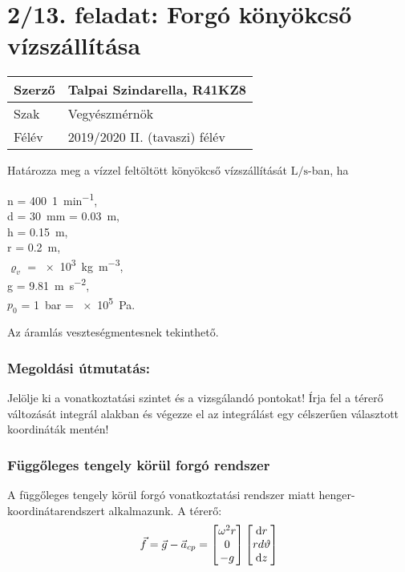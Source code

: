\section*{2/13. feladat: Forgó könyökcső vízszállítása}
\begin{tabular}{ | p{2cm} | p{14cm} | } 
	\hline
	Szerző & Talpai Szindarella, R41KZ8 \\ 
	\hline
	Szak & Vegyészmérnök \\ 
	\hline
	Félév & 2019/2020 II. (tavaszi) félév \\ 
	\hline
\end{tabular}
\vspace{0.5cm}

\noindent Határozza meg a vízzel feltöltött könyökcső vízszállítását $\si{\liter\per\second}$-ban, ha
\begin{flushleft}
	n = \SI{400}{1\per\minute},\\
	d = \SI{30}{\milli\meter} = \SI{0,03}{\meter},\\
	h = \SI{0,15}{\meter},\\
	r = \SI{0,2}{\meter},\\
	$\varrho_{v}$ = \SI{e3}{\kilogram\per\meter\cubed},\\
	g = \SI{9,81}{\meter\per\second\squared},\\
	$p_{0}$ = \SI{1}{\bar} = \SI{e5}{\pascal}.
\end{flushleft}
\vspace{2mm}

\noindent Az áramlás veszteségmentesnek tekinthető.

\subsubsection*{ Megoldási útmutatás:}

\vspace{2mm}

\begin{flushleft}
	Jelölje ki a vonatkoztatási szintet és a vizsgálandó pontokat!
	Írja fel a térerő változását integrál alakban és végezze el az integrálást egy célszerűen választott koordináták mentén!
\end{flushleft}

\noindent\hrulefill

\subsubsection{Függőleges tengely körül forgó rendszer}
A függőleges tengely körül forgó vonatkoztatási rendszer miatt henger-koordinátarendszert alkalmazunk. A térerő: 
\begin{equation}
	\vec{f} = \vec{g} - \vec{a}_{cp}
	=
	\mtrx{\omega ^{2} r \\ 0 \\ -g} \mtrx{\dif r \\ rd \vartheta \\ \dif z}
\end{equation}

